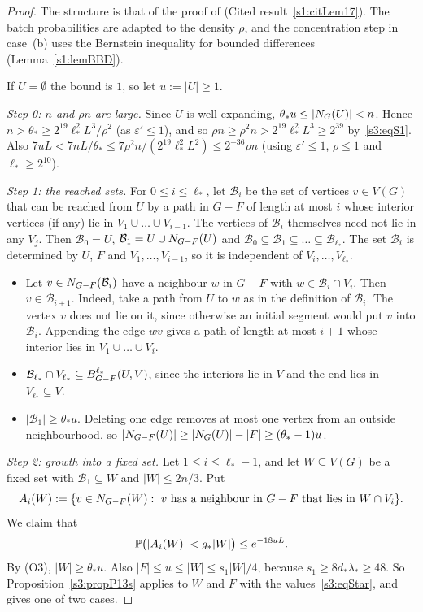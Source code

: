 \begin{proof}
The structure is that of the proof of \cite[Lemma~17]{BM}
(Cited result~\ref{s1:citLem17}). The batch probabilities are adapted to the
density $\rho$, and the concentration step in case~(b) uses the Bernstein
inequality for bounded differences (Lemma~\ref{s1:lemBBD}).

If $U=\emptyset$ the bound is $1$, so let $u:=|U|\ge1$.

\smallskip\noindent\emph{Step 0: $n$ and $\rho n$ are large.} Since $U$
is well-expanding, $\theta_*u\le|N_G(U)|<n$. Hence
$n>\theta_*\ge 2^{19}\ell_*^2L^3/\rho^2$ (as $\varepsilon'\le1$), and so
$\rho n\ge\rho^2n>2^{19}\ell_*^2L^3\ge 2^{39}$ by~\ref{s3:eqS1}. Also
$7uL<7nL/\theta_*\le 7\rho^2n/(2^{19}\ell_*^2L^2)\le 2^{-36}\rho n$ (using
$\varepsilon'\le1$, $\rho\le1$ and $\ell_*\ge2^{10}$).

\smallskip\noindent\emph{Step 1: the reached sets.} For
$0\le i\le\ell_*$, let $\mathcal B_i$ be the set of vertices $v\in V(G)$
that can be reached from $U$ by a path in $G-F$ of length at most $i$
whose interior vertices (if any) lie in $V_1\cup\dots\cup V_{i-1}$. The
vertices of $\mathcal B_i$ themselves need not lie in any $V_j$. Then
$\mathcal B_0=U$, $\mathcal B_1=U\cup N_{G-F}(U)$ and
$\mathcal B_0\subseteq\mathcal B_1\subseteq\dots\subseteq\mathcal
B_{\ell_*}$. The set $\mathcal B_i$ is determined by $U$, $F$ and
$V_1,\dots,V_{i-1}$, so it is independent of $V_i,\dots,V_{\ell_*}$.
\begin{itemize}
\item[(O1)] Let $v\in N_{G-F}(\mathcal B_i)$ have a neighbour $w$ in
  $G-F$ with $w\in\mathcal B_i\cap V_i$. Then
  $v\in\mathcal B_{i+1}$. Indeed, take a path from $U$ to $w$ as in the
  definition of $\mathcal B_i$. The vertex $v$ does not lie on it, since
  otherwise an initial segment would put $v$ into $\mathcal B_i$.
  Appending the edge $wv$ gives a path of length at most $i+1$ whose
  interior lies in $V_1\cup\dots\cup V_i$.
\item[(O2)] $\mathcal B_{\ell_*}\cap V_{\ell_*}\subseteq B^{\ell_*}_{G-F}(U,V)$,
  since the interiors lie in $V$ and the end lies in $V_{\ell_*}\subseteq V$.
\item[(O3)] $|\mathcal B_1|\ge\theta_*u$. Deleting one edge removes at
  most one vertex from an outside neighbourhood, so
  $|N_{G-F}(U)|\ge|N_G(U)|-|F|\ge(\theta_*-1)u$.
\end{itemize}

\smallskip\noindent\emph{Step 2: growth into a fixed set.} Let
$1\le i\le\ell_*-1$, and let $W\subseteq V(G)$ be a fixed set with
$\mathcal B_1\subseteq W$ and $|W|\le 2n/3$. Put
\[
A_i(W):=\{v\in N_{G-F}(W):\ v\text{ has a neighbour in }G-F\text{ that lies in }W\cap V_i\}.
\]
We claim that
\begin{equation}\label{s3:eqL17claim}
\mathbb{P}\big(|A_i(W)|<g_*|W|\big)\le e^{-18uL}.
\end{equation}
By (O3), $|W|\ge\theta_*u$. Also $|F|\le u\le|W|\le s_1|W|/4$, because
$s_1\ge8d_*\lambda_*\ge48$. So Proposition~\ref{s3:propP13s} applies to
$W$ and $F$ with the values~\eqref{s3:eqStar}, and gives one of two
cases.


\end{proof}
